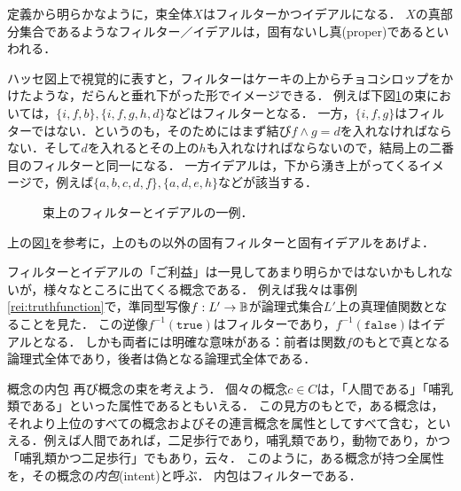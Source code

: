 \documentclass[11pt,a4paper, dvipdfmx]{jsarticle}
\begin{document}
定義から明らかなように，束全体$X$はフィルターかつイデアルになる．
$X$の真部分集合であるようなフィルター／イデアルは，固有ないし真(proper)であるといわれる．

ハッセ図上で視覚的に表すと，フィルターはケーキの上からチョコシロップをかけたような，だらんと垂れ下がった形でイメージできる．
例えば下図\ref{fig:filter}の束においては，$\{ i, f, b \}, \{i, f, g, h, d\}$などはフィルターとなる．
一方，$\{i, f, g\}$はフィルターではない．というのも，そのためにはまず結び$f \wedge g = d$を入れなければならない．そして$d$を入れるとその上の$h$も入れなければならないので，結局上の二番目のフィルターと同一になる．
一方イデアルは，下から湧き上がってくるイメージで，例えば$\{ a, b, c, d, f \}, \{a, d, e, h\}$などが該当する．
\begin{figure}[h]
    \centering
    \caption{束上のフィルターとイデアルの一例．}
    \label{fig:filter} 
\end{figure}

\begin{renshu}{}{}
上の図\ref{fig:filter}を参考に，上のもの以外の固有フィルターと固有イデアルをあげよ．
\end{renshu}

フィルターとイデアルの「ご利益」は一見してあまり明らかではないかもしれないが，様々なところに出てくる概念である．
例えば我々は事例\ref{rei:truthfunction}で，準同型写像$f:L' \to \mathbb{B}$が論理式集合$L'$上の真理値関数となることを見た．
この逆像$f^{-1}(\texttt{true})$はフィルターであり，$f^{-1}(\texttt{false})$はイデアルとなる．
しかも両者には明確な意味がある：前者は関数$f$のもとで真となる論理式全体であり，後者は偽となる論理式全体である．

\begin{rei}{概念の内包}
再び概念の束を考えよう．
個々の概念$c \in C$は，「人間である」「哺乳類である」といった属性であるともいえる．
この見方のもとで，ある概念は，それより上位のすべての概念およびその連言概念を属性としてすべて含む，といえる．例えば人間であれば，二足歩行であり，哺乳類であり，動物であり，かつ「哺乳類かつ二足歩行」でもあり，云々．
このように，ある概念が持つ全属性を，その概念の\emph{内包}(intent)と呼ぶ．
内包はフィルターである．
\end{rei}
\end{document}
